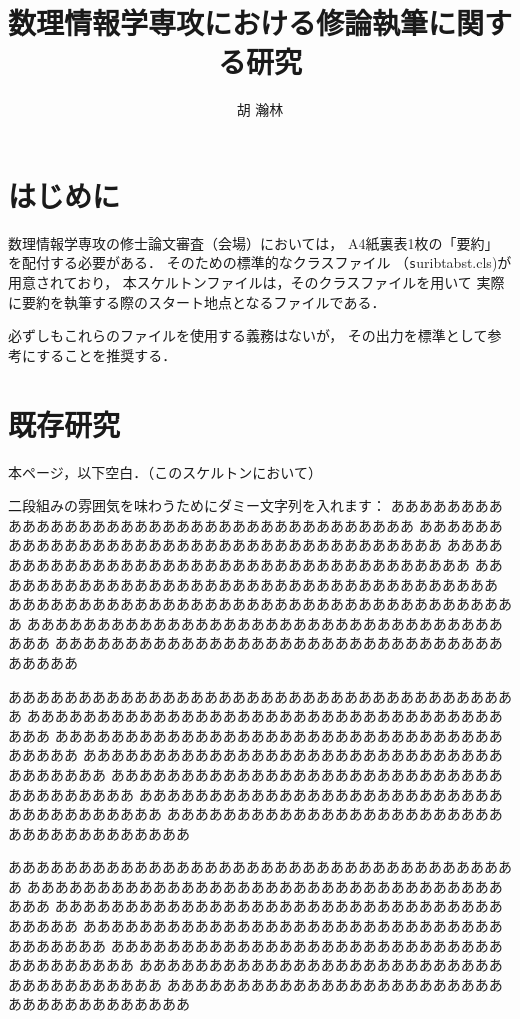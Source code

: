 \documentclass[papersize]{suribtabst}
\title{数理情報学専攻における修論執筆に関する研究}
\author{胡 瀚林}
\begin{document}
\maketitle

\section{はじめに} %

数理情報学専攻の修士論文審査（会場）においては，
A4紙裏表1枚の「要約」を配付する必要がある．
そのための標準的なクラスファイル
（{\texttt suribtabst.cls})が用意されており，
本スケルトンファイルは，そのクラスファイルを用いて
実際に要約を執筆する際のスタート地点となるファイルである．

必ずしもこれらのファイルを使用する義務はないが，
その出力を標準として参考にすることを推奨する．

\section{既存研究}

本ページ，以下空白．（このスケルトンにおいて）

二段組みの雰囲気を味わうためにダミー文字列を入れます：
あああああああああああああああああああああああああああああああああああああ
あああああああああああああああああああああああああああああああああああああ
あああああああああああああああああああああああああああああああああああああ
あああああああああああああああああああああああああああああああああああああ
あああああああああああああああああああああああああああああああああああああ
あああああああああああああああああああああああああああああああああああああ
あああああああああああああああああああああああああああああああああああああ

あああああああああああああああああああああああああああああああああああああ
あああああああああああああああああああああああああああああああああああああ
あああああああああああああああああああああああああああああああああああああ
あああああああああああああああああああああああああああああああああああああ
あああああああああああああああああああああああああああああああああああああ
あああああああああああああああああああああああああああああああああああああ
あああああああああああああああああああああああああああああああああああああ

あああああああああああああああああああああああああああああああああああああ
あああああああああああああああああああああああああああああああああああああ
あああああああああああああああああああああああああああああああああああああ
あああああああああああああああああああああああああああああああああああああ
あああああああああああああああああああああああああああああああああああああ
あああああああああああああああああああああああああああああああああああああ
あああああああああああああああああああああああああああああああああああああ
\end{document}
